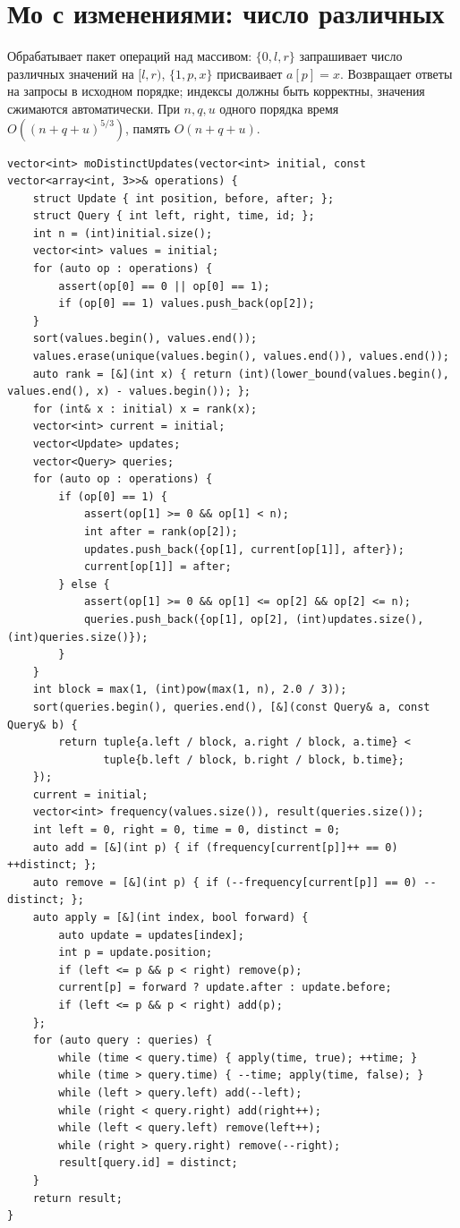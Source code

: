 \section{Мо с изменениями: число различных}
Обрабатывает пакет операций над массивом: $\{0,l,r\}$ запрашивает число различных значений на $[l,r)$, $\{1,p,x\}$ присваивает $a[p]=x$.
Возвращает ответы на запросы в исходном порядке; индексы должны быть корректны, значения сжимаются автоматически.
При $n,q,u$ одного порядка время $O((n+q+u)^{5/3})$, память $O(n+q+u)$.
\begin{lstlisting}[name=optimization_mo]
vector<int> moDistinctUpdates(vector<int> initial, const vector<array<int, 3>>& operations) {
    struct Update { int position, before, after; };
    struct Query { int left, right, time, id; };
    int n = (int)initial.size();
    vector<int> values = initial;
    for (auto op : operations) {
        assert(op[0] == 0 || op[0] == 1);
        if (op[0] == 1) values.push_back(op[2]);
    }
    sort(values.begin(), values.end());
    values.erase(unique(values.begin(), values.end()), values.end());
    auto rank = [&](int x) { return (int)(lower_bound(values.begin(), values.end(), x) - values.begin()); };
    for (int& x : initial) x = rank(x);
    vector<int> current = initial;
    vector<Update> updates;
    vector<Query> queries;
    for (auto op : operations) {
        if (op[0] == 1) {
            assert(op[1] >= 0 && op[1] < n);
            int after = rank(op[2]);
            updates.push_back({op[1], current[op[1]], after});
            current[op[1]] = after;
        } else {
            assert(op[1] >= 0 && op[1] <= op[2] && op[2] <= n);
            queries.push_back({op[1], op[2], (int)updates.size(), (int)queries.size()});
        }
    }
    int block = max(1, (int)pow(max(1, n), 2.0 / 3));
    sort(queries.begin(), queries.end(), [&](const Query& a, const Query& b) {
        return tuple{a.left / block, a.right / block, a.time} <
               tuple{b.left / block, b.right / block, b.time};
    });
    current = initial;
    vector<int> frequency(values.size()), result(queries.size());
    int left = 0, right = 0, time = 0, distinct = 0;
    auto add = [&](int p) { if (frequency[current[p]]++ == 0) ++distinct; };
    auto remove = [&](int p) { if (--frequency[current[p]] == 0) --distinct; };
    auto apply = [&](int index, bool forward) {
        auto update = updates[index];
        int p = update.position;
        if (left <= p && p < right) remove(p);
        current[p] = forward ? update.after : update.before;
        if (left <= p && p < right) add(p);
    };
    for (auto query : queries) {
        while (time < query.time) { apply(time, true); ++time; }
        while (time > query.time) { --time; apply(time, false); }
        while (left > query.left) add(--left);
        while (right < query.right) add(right++);
        while (left < query.left) remove(left++);
        while (right > query.right) remove(--right);
        result[query.id] = distinct;
    }
    return result;
}
\end{lstlisting}
\fi

